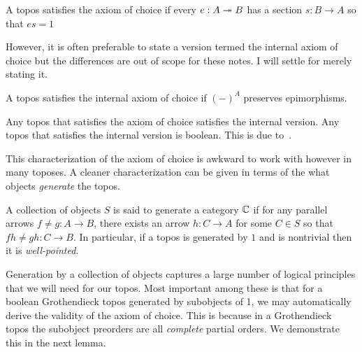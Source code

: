 \begin{defn}\label{defn:background:aoc}
  A topos satisfies the axiom of choice if every $e : A \twoheadrightarrow B$ has a
  section $s : B \to A$ so that $es = 1$
\end{defn}

However, it is often preferable to state a version termed the internal
axiom of choice but the differences are out of scope for these
notes. I will settle for merely stating it.

\begin{defn}\label{defn:background:iaoc}
  A topos satisfies the internal axiom of choice if $(-)^A$ preserves
  epimorphisms.
\end{defn}

\begin{remark}
  Any topos that satisfies the axiom of choice satisfies the internal
  version. Any topos that satisfies the internal version is
  boolean. This is due to~\citet{Diaconescu:75}.
\end{remark}

This characterization of the axiom of choice is awkward to work with
however in many toposes. A cleaner characterization can be given in
terms of the what objects \emph{generate} the topos.

\begin{defn}\label{defn:background:generate}
  A collection of objects $S$ is said to generate a category $\mathbb{C}$
  if for any parallel arrows $f \neq g : A \to B$, there exists an
  arrow $h : C \to A$ for some $C \in S$ so that
  $fh \neq gh : C \to B$. In particular, if a topos is generated by
  $1$ and is nontrivial then it is \emph{well-pointed}.
\end{defn}

Generation by a collection of objects captures a large number of
logical principles that we will need for our topos. Most important
among these is that for a boolean Grothendieck topos generated by
subobjects of 1, we may automatically derive the validity of the axiom
of choice. This is because in a Grothendieck topos the subobject
preorders are all \emph{complete} partial orders. We demonstrate this
in the next lemma.

